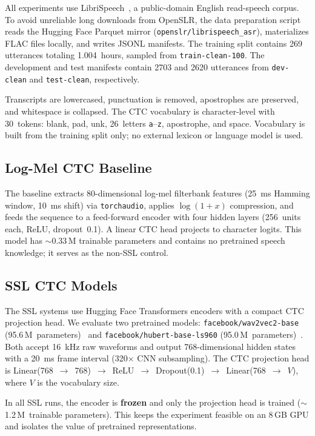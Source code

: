 \documentclass{article}
\begin{document}
All experiments use LibriSpeech~\cite{panayotov2015librispeech}, a
public-domain English read-speech corpus. To avoid unreliable long downloads
from OpenSLR, the data preparation script reads the Hugging Face Parquet mirror
(\texttt{openslr/librispeech\_asr}), materializes
FLAC files locally, and writes JSONL manifests. The training split contains 269
utterances totaling 1.004~hours, sampled from \texttt{train-clean-100}. The
development and test manifests contain 2703 and 2620 utterances from
\texttt{dev-clean} and \texttt{test-clean}, respectively.

Transcripts are lowercased, punctuation is removed, apostrophes are preserved,
and whitespace is collapsed. The CTC vocabulary is character-level with
30~tokens: blank, pad, unk, 26~letters \texttt{a}--\texttt{z}, apostrophe, and
space. Vocabulary is built from the training split only; no external lexicon or
language model is used.

\subsection{Log-Mel CTC Baseline}

The baseline extracts 80-dimensional log-mel filterbank features (25~ms Hamming
window, 10~ms shift) via \texttt{torchaudio}, applies $\log(1+x)$ compression,
and feeds the sequence to a feed-forward encoder with four hidden layers
(256~units each, ReLU, dropout~0.1). A linear CTC head projects to character
logits. This model has $\sim$0.33\,M trainable parameters and contains no
pretrained speech knowledge; it serves as the non-SSL control.

\subsection{SSL CTC Models}

The SSL systems use Hugging Face Transformers encoders with a compact CTC
projection head. We evaluate two pretrained models:
\texttt{facebook/wav2vec2-base} (95.6\,M~parameters)~\cite{baevski2020wav2vec}
and \texttt{facebook/hubert-base-ls960} (95.0\,M~parameters)~\cite{hsu2021hubert}.
Both accept 16~kHz raw waveforms and output 768-dimensional hidden states with
a 20~ms frame interval (320$\times$ CNN subsampling). The CTC projection head
is Linear(768~$\to$~768)~$\to$~ReLU~$\to$~Dropout(0.1)~$\to$~Linear(768~$\to$~$V$),
where $V$ is the vocabulary size.

In all SSL runs, the encoder is {\bfseries frozen} and only the projection head
is trained ($\sim$1.2\,M~trainable parameters). This keeps the experiment
feasible on an 8\,GB GPU and isolates the value of pretrained representations.
\end{document}
